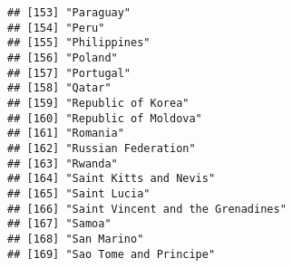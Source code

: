 \documentclass[
]{article}
\begin{document}
\begin{verbatim}
## [153] "Paraguay"                                                                                                                                             
## [154] "Peru"                                                                                                                                                 
## [155] "Philippines"                                                                                                                                          
## [156] "Poland"                                                                                                                                               
## [157] "Portugal"                                                                                                                                             
## [158] "Qatar"                                                                                                                                                
## [159] "Republic of Korea"                                                                                                                                    
## [160] "Republic of Moldova"                                                                                                                                  
## [161] "Romania"                                                                                                                                              
## [162] "Russian Federation"                                                                                                                                   
## [163] "Rwanda"                                                                                                                                               
## [164] "Saint Kitts and Nevis"                                                                                                                                
## [165] "Saint Lucia"                                                                                                                                          
## [166] "Saint Vincent and the Grenadines"                                                                                                                     
## [167] "Samoa"                                                                                                                                                
## [168] "San Marino"                                                                                                                                           
## [169] "Sao Tome and Principe"                                                                                                                                

\end{verbatim}
\end{document}

